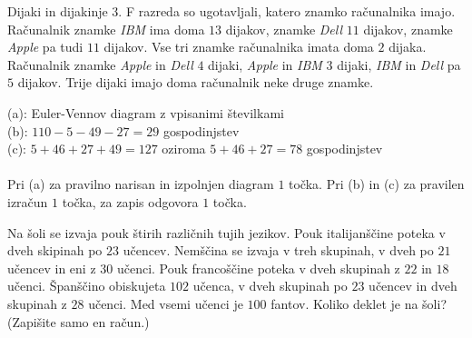\documentclass[addpoints]{exam}
\begin{document}
\begin{questions}
    \question
    Dijaki in dijakinje 3. F razreda so ugotavljali, katero znamko računalnika imajo.
    Računalnik znamke \textit{IBM} ima doma $13$ dijakov, znamke \textit{Dell} $11$ dijakov, znamke \textit{Apple} pa tudi $11$ dijakov.
    Vse tri znamke računalnika imata doma $2$ dijaka. Računalnik znamke \textit{Apple} in \textit{Dell} $4$ dijaki, \textit{Apple} in \textit{IBM} $3$ dijaki, \textit{IBM} in \textit{Dell} pa $5$ dijakov.
    Trije dijaki imajo doma računalnik neke druge znamke.

    \begin{solution}[8.5cm]
        (a): Euler-Vennov diagram z vpisanimi številkami \\
        (b): $110-5-49-27=29$ gospodinjstev\\
        (c): $5+46+27+49=127$ oziroma $5+46+27=78$ gospodinjstev \\ \\
        Pri (a) za pravilno narisan in izpolnjen diagram $1$ točka. Pri (b) in (c) za pravilen izračun $1$ točka, za zapis odgovora $1$ točka.
    \end{solution}




     \newpage
        

    \question[3]
    Na šoli se izvaja pouk štirih različnih tujih jezikov. Pouk italijanščine poteka v dveh skipinah po $23$ učencev. 
    Nemščina se izvaja v treh skupinah, v dveh po $21$ učencev in eni z $30$ učenci. Pouk francoščine poteka v dveh skupinah z $22$ in $18$ učenci.
    Španščino obiskujeta $102$ učenca, v dveh skupinah po $23$ učencev in dveh skupinah z $28$ učenci.
    Med vsemi učenci je $100$ fantov. Koliko deklet je na šoli? (Zapišite samo en račun.)


\end{questions}
\end{document}
